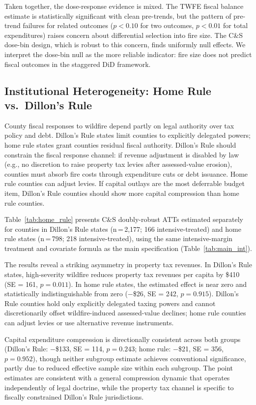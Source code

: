 \documentclass[12pt]{article}
\begin{document}
Taken together, the dose-response evidence is mixed. The TWFE fiscal balance
estimate is statistically significant with clean pre-trends, but the pattern of
pre-trend failures for related outcomes ($p < 0.10$ for two outcomes, $p < 0.01$
for total expenditures) raises concern about differential selection into fire
size. The C\&S dose-bin design, which is robust to this concern, finds uniformly
null effects. We interpret the dose-bin null as the more reliable indicator: fire
size does not predict fiscal outcomes in the staggered DiD framework.

\subsection{Institutional Heterogeneity: Home Rule vs.\ Dillon's Rule}
\label{sec:home_rule}

County fiscal responses to wildfire depend partly on legal authority over tax policy
and debt. Dillon's Rule states limit counties to explicitly delegated powers; home
rule states grant counties residual fiscal authority. Dillon's Rule should constrain
the fiscal response channel: if revenue adjustment is disabled by law (e.g., no
discretion to raise property tax levies after assessed-value erosion), counties must
absorb fire costs through expenditure cuts or debt issuance. Home rule counties can
adjust levies. If capital outlays are the most deferrable budget item, Dillon's Rule
counties should show more capital compression than home rule counties.

Table~\ref{tab:home_rule} presents C\&S doubly-robust ATTs estimated separately
for counties in Dillon's Rule states (n\,=\,2{,}177; 166 intensive-treated)
and home rule states (n\,=\,798; 218 intensive-treated), using the same
intensive-margin treatment and covariate formula as the main specification
(Table~\ref{tab:main_int}).

The results reveal a striking asymmetry in property tax revenues. In Dillon's
Rule states, high-severity wildfire reduces property tax revenues per capita
by \$410 (SE = 161, $p = 0.011$). In home rule states, the estimated effect
is near zero and statistically indistinguishable from zero ($-$\$26, SE = 242,
$p = 0.915$). Dillon's Rule counties hold only explicitly delegated taxing powers
and cannot discretionarily offset wildfire-induced assessed-value declines; home
rule counties can adjust levies or use alternative revenue instruments.

Capital expenditure compression is directionally consistent across both groups
(Dillon's Rule: $-$\$133, SE = 114, $p = 0.243$; home rule: $-$\$21,
SE = 356, $p = 0.952$), though neither subgroup estimate achieves conventional
significance, partly due to reduced effective sample size within each subgroup.
The point estimates are consistent with a general compression dynamic that
operates independently of legal doctrine, while the property tax channel is
specific to fiscally constrained Dillon's Rule jurisdictions.
\end{document}
